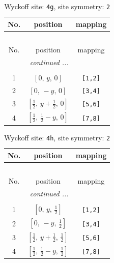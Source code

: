 \documentclass[fleqn,8pt]{jsarticle}
\begin{document}
\renewcommand{\arraystretch}{1.2}
\begin{longtable}{ccc}
\caption{Wyckoff site: {\tt 4g}, site symmetry: {\tt 2}}
 \\
 \hline \hline
No. & position & mapping \\ \hline \endfirsthead

\multicolumn{2}{l}{\tablename\ \thetable{}} \\
 \hline \hline
No. & position & mapping \\ \hline \endhead

 \hline \hline
\multicolumn{2}{r}{\footnotesize\it continued ...} \\ \endfoot

 \hline \hline
\multicolumn{2}{r}{} \\ \endlastfoot

1 & $\left[ 0,\, y,\, 0 \right]$ & {\tt [1,2]} \\ \hline
2 & $\left[ 0,\, - y,\, 0 \right]$ & {\tt [3,4]} \\ \hline
3 & $\left[ \frac{1}{2},\, y + \frac{1}{2},\, 0 \right]$ & {\tt [5,6]} \\ \hline
4 & $\left[ \frac{1}{2},\, \frac{1}{2} - y,\, 0 \right]$ & {\tt [7,8]} \\
\end{longtable}
\renewcommand{\arraystretch}{1.2}
\begin{longtable}{ccc}
\caption{Wyckoff site: {\tt 4h}, site symmetry: {\tt 2}}
 \\
 \hline \hline
No. & position & mapping \\ \hline \endfirsthead

\multicolumn{2}{l}{\tablename\ \thetable{}} \\
 \hline \hline
No. & position & mapping \\ \hline \endhead

 \hline \hline
\multicolumn{2}{r}{\footnotesize\it continued ...} \\ \endfoot

 \hline \hline
\multicolumn{2}{r}{} \\ \endlastfoot

1 & $\left[ 0,\, y,\, \frac{1}{2} \right]$ & {\tt [1,2]} \\ \hline
2 & $\left[ 0,\, - y,\, \frac{1}{2} \right]$ & {\tt [3,4]} \\ \hline
3 & $\left[ \frac{1}{2},\, y + \frac{1}{2},\, \frac{1}{2} \right]$ & {\tt [5,6]} \\ \hline
4 & $\left[ \frac{1}{2},\, \frac{1}{2} - y,\, \frac{1}{2} \right]$ & {\tt [7,8]} \\
\end{longtable}
\end{document}
